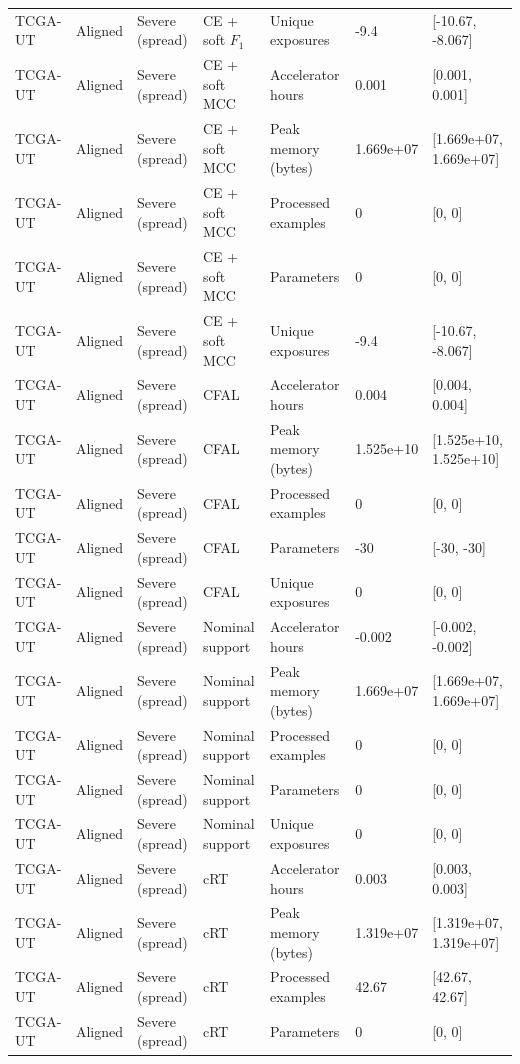 \begin{longtable}{lllllll}
TCGA-UT & Aligned & Severe (spread) & CE + soft $F_1$ & Unique exposures & -9.4 & [-10.67, -8.067] \\
TCGA-UT & Aligned & Severe (spread) & CE + soft MCC & Accelerator hours & 0.001 & [0.001, 0.001] \\
TCGA-UT & Aligned & Severe (spread) & CE + soft MCC & Peak memory (bytes) & 1.669e+07 & [1.669e+07, 1.669e+07] \\
TCGA-UT & Aligned & Severe (spread) & CE + soft MCC & Processed examples & 0 & [0, 0] \\
TCGA-UT & Aligned & Severe (spread) & CE + soft MCC & Parameters & 0 & [0, 0] \\
TCGA-UT & Aligned & Severe (spread) & CE + soft MCC & Unique exposures & -9.4 & [-10.67, -8.067] \\
TCGA-UT & Aligned & Severe (spread) & CFAL & Accelerator hours & 0.004 & [0.004, 0.004] \\
TCGA-UT & Aligned & Severe (spread) & CFAL & Peak memory (bytes) & 1.525e+10 & [1.525e+10, 1.525e+10] \\
TCGA-UT & Aligned & Severe (spread) & CFAL & Processed examples & 0 & [0, 0] \\
TCGA-UT & Aligned & Severe (spread) & CFAL & Parameters & -30 & [-30, -30] \\
TCGA-UT & Aligned & Severe (spread) & CFAL & Unique exposures & 0 & [0, 0] \\
TCGA-UT & Aligned & Severe (spread) & Nominal support & Accelerator hours & -0.002 & [-0.002, -0.002] \\
TCGA-UT & Aligned & Severe (spread) & Nominal support & Peak memory (bytes) & 1.669e+07 & [1.669e+07, 1.669e+07] \\
TCGA-UT & Aligned & Severe (spread) & Nominal support & Processed examples & 0 & [0, 0] \\
TCGA-UT & Aligned & Severe (spread) & Nominal support & Parameters & 0 & [0, 0] \\
TCGA-UT & Aligned & Severe (spread) & Nominal support & Unique exposures & 0 & [0, 0] \\
TCGA-UT & Aligned & Severe (spread) & cRT & Accelerator hours & 0.003 & [0.003, 0.003] \\
TCGA-UT & Aligned & Severe (spread) & cRT & Peak memory (bytes) & 1.319e+07 & [1.319e+07, 1.319e+07] \\
TCGA-UT & Aligned & Severe (spread) & cRT & Processed examples & 42.67 & [42.67, 42.67] \\
TCGA-UT & Aligned & Severe (spread) & cRT & Parameters & 0 & [0, 0] \\

\end{longtable}
